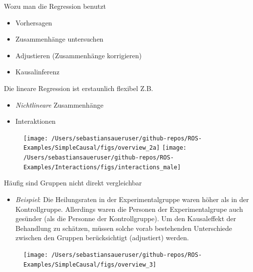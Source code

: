 \documentclass[
  ngerman,
  ignorenonframetext,
]{beamer}
\providecommand{\tightlist}{%
  \setlength{\itemsep}{0pt}\setlength{\parskip}{0pt}}
\begin{document}
\begin{frame}{Wozu man die Regression benutzt}
\protect\hypertarget{wozu-man-die-regression-benutzt}{}
\begin{itemize}
\item
  Vorhersagen
\item
  Zusammenhänge untersuchen
\item
  Adjustieren (Zusammenhänge korrigieren)
\item
  Kausalinferenz
\end{itemize}
\end{frame}


\begin{frame}{Die lineare Regression ist erstaunlich flexibel}
\protect\hypertarget{die-lineare-regression-ist-erstaunlich-flexibel}{}
Z.B.

\begin{itemize}
\item
  \emph{Nichtlineare} Zusammenhänge
\item
  Interaktionen
\end{itemize}

\begin{figure}[H]
\texttt{[image: /Users/sebastiansaueruser/github-repos/ROS-Examples/SimpleCausal/figs/overview\_2a]} \texttt{[image: /Users/sebastiansaueruser/github-repos/ROS-Examples/Interactions/figs/interactions\_male]} \end{figure}
\end{frame}

\begin{frame}{Häufig sind Gruppen nicht direkt vergleichbar}
\protect\hypertarget{huxe4ufig-sind-gruppen-nicht-direkt-vergleichbar}{}
\begin{itemize}
\tightlist
\item
  \emph{Beispiel}: Die Heilungsraten in der Experimentalgruppe waren
  höher als in der Kontrollgruppe. Allerdings waren die Personen der
  Experimentalgrupe auch gesünder (als die Personne der Kontrollgruppe).
  Um den Kausaleffekt der Behandlung zu schätzen, müssen solche vorab
  bestehenden Unterschiede zwischen den Gruppen berücksichtigt
  (adjustiert) werden.
\end{itemize}

\begin{figure}[H]
\texttt{[image: /Users/sebastiansaueruser/github-repos/ROS-Examples/SimpleCausal/figs/overview\_3]} \end{figure}
\end{frame}
\end{document}
